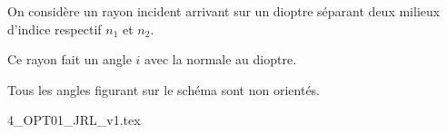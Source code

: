 	

	
	
	\hauteurLargeurCadreReponse		{8mm}{5cm}
	\typeEntrainement				{} %
	\initialisationEntrainement
	
	
	\initialisationPartieGauche %
	
	On considère un rayon incident arrivant sur un dioptre séparant deux milieux d'indice respectif $n_1$ et $n_2$. 
	
	Ce rayon fait un angle $i$ avec la normale au dioptre. 
	
	Tous les angles figurant sur le schéma sont non orientés. 
	
		
	\initialisationPartieDroite %
	\begin{center}
		{4_OPT01_JRL_v1.tex}
	\end{center}
	\finalisationDuPartageDePage %
	
